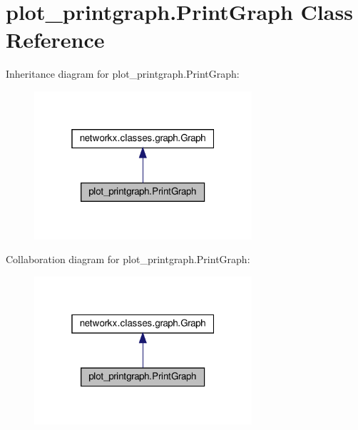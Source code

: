 \hypertarget{classplot__printgraph_1_1PrintGraph}{}\section{plot\+\_\+printgraph.\+Print\+Graph Class Reference}
\label{classplot__printgraph_1_1PrintGraph}


Inheritance diagram for plot\+\_\+printgraph.\+Print\+Graph\+:
\nopagebreak
\begin{figure}[H]
\begin{center}
\leavevmode
\includegraphics[width=229pt]{classplot__printgraph_1_1PrintGraph__inherit__graph}
\end{center}
\end{figure}


Collaboration diagram for plot\+\_\+printgraph.\+Print\+Graph\+:
\nopagebreak
\begin{figure}[H]
\begin{center}
\leavevmode
\includegraphics[width=229pt]{classplot__printgraph_1_1PrintGraph__coll__graph}
\end{center}
\end{figure}
